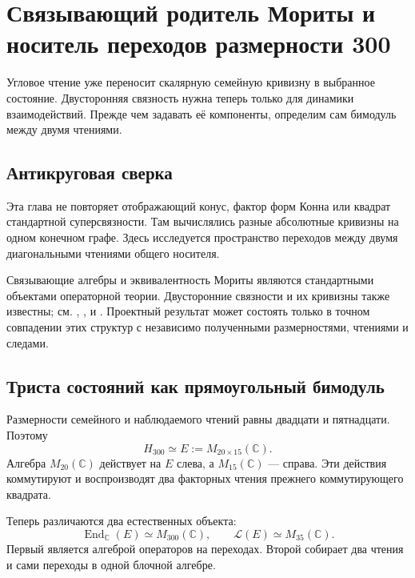 \chapter{Связывающий родитель Мориты и носитель переходов размерности 300}

Угловое чтение уже переносит скалярную семейную кривизну в выбранное
состояние. Двусторонняя связность нужна теперь только для динамики
взаимодействий. Прежде чем задавать её компоненты, определим сам бимодуль
между двумя чтениями.

\section{Антикруговая сверка}

Эта глава не повторяет отображающий конус, фактор форм Конна или квадрат
стандартной суперсвязности. Там вычислялись разные абсолютные кривизны на
одном конечном графе. Здесь исследуется пространство переходов между двумя
диагональными чтениями общего носителя.

Связывающие алгебры и эквивалентность Мориты являются стандартными
объектами операторной теории. Двусторонние связности и их кривизны также
известны; см. , ,
 и . Проектный результат
может состоять только в точном совпадении этих структур с независимо
полученными размерностями, чтениями и следами.

\section{Триста состояний как прямоугольный бимодуль}

Размерности семейного и наблюдаемого чтений равны двадцати и пятнадцати.
Поэтому
\begin{equation}
 H_{300}\simeq E:=M_{20\times15}(\mathbb C).
 \label{eq:v5-morita-carrier}
\end{equation}
Алгебра $M_{20}(\mathbb C)$ действует на $E$ слева, а
$M_{15}(\mathbb C)$ --- справа. Эти действия коммутируют и воспроизводят
два факторных чтения прежнего коммутирующего квадрата.

Теперь различаются два естественных объекта:
\begin{equation}
 \operatorname{End}_{\mathbb C}(E)\simeq M_{300}(\mathbb C),
 \qquad
 \mathcal L(E)\simeq M_{35}(\mathbb C).
 \label{eq:v5-endomorphism-linking-distinction}
\end{equation}
Первый является алгеброй операторов на переходах. Второй собирает два
чтения и сами переходы в одной блочной алгебре.

